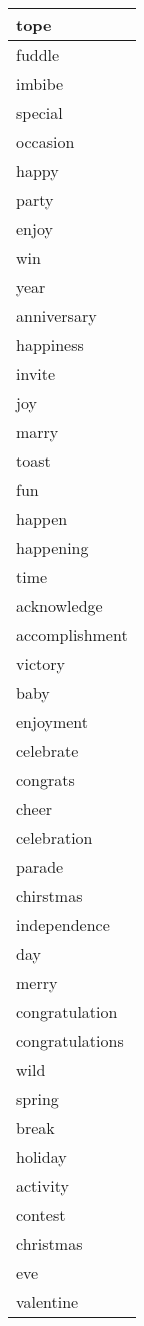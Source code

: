 \begin{longtable}{|p{3cm}|}
tope \\ \hline
fuddle \\ \hline
imbibe \\ \hline
special \\ \hline
occasion \\ \hline
happy \\ \hline
party \\ \hline
enjoy \\ \hline
win \\ \hline
year \\ \hline
anniversary \\ \hline
happiness \\ \hline
invite \\ \hline
joy \\ \hline
marry \\ \hline
toast \\ \hline
fun \\ \hline
happen \\ \hline
happening \\ \hline
time \\ \hline
acknowledge \\ \hline
accomplishment \\ \hline
victory \\ \hline
baby \\ \hline
enjoyment \\ \hline
celebrate \\ \hline
congrats \\ \hline
cheer \\ \hline
celebration \\ \hline
parade \\ \hline
chirstmas \\ \hline
independence \\ \hline
day \\ \hline
merry \\ \hline
congratulation \\ \hline
congratulations \\ \hline
wild \\ \hline
spring \\ \hline
break \\ \hline
holiday \\ \hline
activity \\ \hline
contest \\ \hline
christmas \\ \hline
eve \\ \hline
valentine \\ \hline

\end{longtable}

